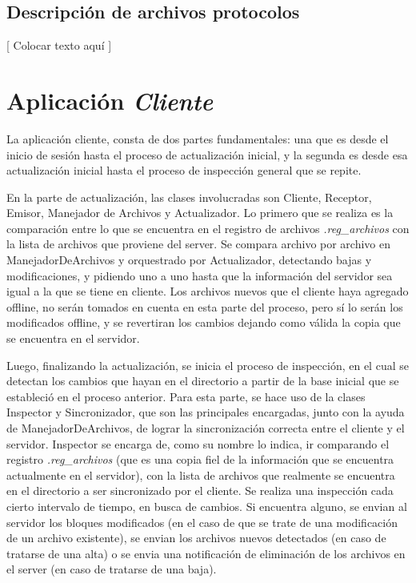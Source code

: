 \documentclass{article}
\begin{document}
\subsection{Descripción de archivos  protocolos}

	[ Colocar texto aquí ]
\bigskip




\section{Aplicación \textit{Cliente}}

	La aplicación cliente, consta de dos partes fundamentales: una que es desde el inicio de sesión hasta el proceso de actualización inicial, y la segunda es desde esa actualización inicial hasta el proceso de inspección general que se repite. 
	\par
	En la parte de actualización, las clases involucradas son Cliente, Receptor, Emisor, Manejador de Archivos y Actualizador. Lo primero que se realiza es la comparación entre lo que se encuentra en el registro de archivos \textit{.reg_archivos} con la lista de archivos que proviene del server. Se compara archivo por archivo en ManejadorDeArchivos y orquestrado por Actualizador, detectando bajas y modificaciones, y pidiendo uno a uno hasta que la información del servidor sea igual a la que se tiene en cliente. Los archivos nuevos que el cliente haya agregado offline, no serán tomados en cuenta en esta parte del proceso, pero sí lo serán los modificados offline, y se revertiran los cambios dejando como válida la copia que se encuentra en el servidor.
	\par
	Luego, finalizando la actualización, se inicia el proceso de inspección, en el cual se detectan los cambios que hayan en el directorio a partir de la base inicial que se estableció en el proceso anterior. Para esta parte, se hace uso de la clases Inspector y Sincronizador, que son las principales encargadas, junto con la ayuda de ManejadorDeArchivos, de lograr la sincronización correcta entre el cliente y el servidor. 
	Inspector se encarga de, como su nombre lo indica, ir comparando el registro \textit{.reg_archivos} (que es una copia fiel de la información que se encuentra actualmente en el servidor), con la lista de archivos que realmente se encuentra en el directorio a ser sincronizado por el cliente. Se realiza una inspección cada cierto intervalo de tiempo, en busca de cambios. Si encuentra alguno, se envian al servidor los bloques modificados (en el caso de que se trate de una modificación de un archivo existente), se envian los archivos nuevos detectados (en caso de tratarse de una alta) o se envia una notificación de eliminación de los archivos en el server (en caso de tratarse de una baja). 
\end{document}
